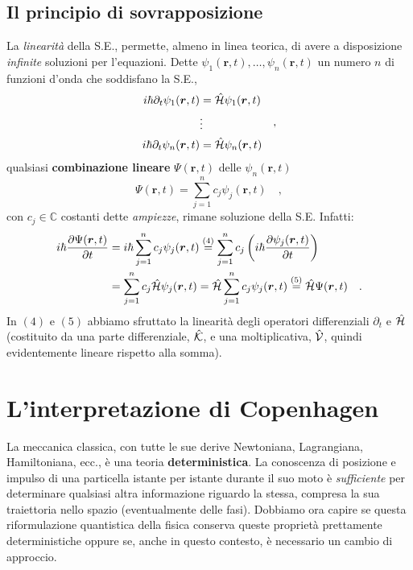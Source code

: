 \subsection{Il principio di sovrapposizione}
La \emph{linearità} della S.E., permette, almeno in linea teorica, di avere a disposizione \emph{infinite} soluzioni per l'equazioni. Dette $\psi_1(\bm{r},t), \dots, \psi_n(\bm{r},t)$ un numero $n$ di funzioni d'onda che soddisfano la S.E.,
\[
    \begin{aligned}
        i\hbar \partial_t\psi_1(\bm{r},t) &= \hat{\mathcal{H}}\psi_1(\bm{r},t)\\
        &\vdots  \\
        i\hbar \partial_t\psi_n(\bm{r},t) &= \hat{\mathcal{H}}\psi_n(\bm{r},t)
    \end{aligned}
    \quad,
\]
qualsiasi \textbf{combinazione lineare} $\Psi(\bm{r},t)$ delle $\psi_n(\bm{r},t)$ 
\begin{equation}
    \Psi(\bm{r},t) = \sum_{j=1}^n c_j\psi_j(\bm{r},t) \quad,
\end{equation}
con $c_j \in \mathbb{C}$ costanti dette \emph{ampiezze}, rimane soluzione della S.E. Infatti:
\begin{equation*}
\begin{aligned}
    i\hbar\pdv{\Psi(\bm{r},t)}{t} &= i\hbar \sum_{j=1}^n c_j\psi_j(\bm{r},t) \overset{(4)}{=} \sum_{j=1}^n c_j \left(i\hbar \pdv{\psi_j(\bm{r},t)}{t} \right)\\ &= \sum_{j=1}^n c_j \hat{\mathcal{H}}\psi_j(\bm{r},t) = \hat{\mathcal{H}}\sum_{j=1}^n c_j\psi_j(\bm{r},t) \overset{(5)}{=} \hat{\mathcal{H}}\Psi(\bm{r},t) \quad.
\end{aligned}
\end{equation*}
In $(4)$ e $(5)$ abbiamo sfruttato la linearità degli operatori differenziali $\partial_t$ e $\hat{\mathcal{H}}$ (costituito da una parte differenziale, $\hat{\mathcal{K}}$, e una moltiplicativa, $\hat{\mathcal{V}}$, quindi evidentemente lineare rispetto alla somma).

\section{L'interpretazione di Copenhagen}
La meccanica classica, con tutte le sue derive Newtoniana, Lagrangiana, Hamiltoniana, ecc., è una teoria \textbf{deterministica}. La conoscenza di posizione e impulso di una particella istante per istante durante il suo moto è \emph{sufficiente} per determinare qualsiasi altra informazione riguardo la stessa, compresa la sua traiettoria nello spazio (eventualmente delle fasi). Dobbiamo ora capire se questa riformulazione quantistica della fisica conserva queste proprietà prettamente deterministiche oppure se, anche in questo contesto, è necessario un cambio di approccio. 

